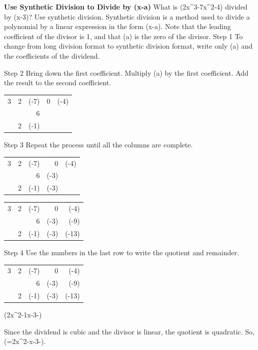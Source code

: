 \documentclass{article}
\newenvironment{example}[1]{}{}         %
\newcommand{\answer}[1]{}               %
\newcommand{\placeholder}[2]{}          %
\newcommand{\te}[1]{}                   %
\begin{document}
\begin{example}{2}
\textbf{Use Synthetic Division to Divide by (x-a)}
What is (2x^3-7x^2-4) divided by (x-3)? Use synthetic division.
Synthetic division is a method used to divide a polynomial by a linear expression in the form (x-a). Note that the leading coefficient of the divisor is 1, and that (a) is the zero of the divisor.
Step 1 To change from long division format to synthetic division format, write only (a) and the coefficients of the dividend.
\placeholder{diagram}{Conversion diagram: long-division setup (x-3) outside, (2x^3-7x^2+0x-4) inside. Down arrows connect -3 in divisor to red 3 labeled zero of the divisor, a, and connect dividend terms to blue coefficients 2, -7, 0, -4, labeled coefficients of the dividend. A short division bracket surrounds 3 at the left of coefficient row.}
Step 2 Bring down the first coefficient. Multiply (a) by the first coefficient. Add the result to the second coefficient.
\begin{tabular}{r|rrrr}
3 & 2 & (-7) & 0 & (-4) \\
 & & 6 & & \\
\hline
 & 2 & (-1) & & \\
\end{tabular}
\te{Callouts: (3\cdot2=6); (-7+6=-1). CONTINUED ON THE NEXT PAGE.}
Step 3 Repeat the process until all the columns are complete.
\begin{tabular}{r|rrrr}
3 & 2 & (-7) & 0 & (-4) \\
 & & 6 & (-3) & \\
\hline
 & 2 & (-1) & (-3) & \\
\end{tabular}
\te{Callout: (3\cdot-1=-3).}
\begin{tabular}{r|rrrr}
3 & 2 & (-7) & 0 & (-4) \\
 & & 6 & (-3) & (-9) \\
\hline
 & 2 & (-1) & (-3) & (-13) \\
\end{tabular}
\te{Callout: (3\cdot-3=-9). COMMON ERROR Remember to keep track of all positive and negative signs when multiplying.}
Step 4 Use the numbers in the last row to write the quotient and remainder.
\begin{tabular}{r|rrrr}
3 & 2 & (-7) & 0 & (-4) \\
 & & 6 & (-3) & (-9) \\
\hline
 & 2 & (-1) & (-3) & (-13) \\
\end{tabular}
(2x^2-1x-3-)
\te{Callouts label 2, -1, -3 as coefficients of the quotient and -13 as remainder, with downward arrows connecting each to the corresponding term.}
Since the dividend is cubic and the divisor is linear, the quotient is quadratic.
So, (=2x^2-x-3-).
\answer{(2x^2-x-3-\frac{13}{x-3})}
\te{USE STRUCTURE You can use the result to write the dividend (2x^3-7x-4) in the form ((2x^2-x-3)(x-3)-13). Printed callout omits the exponent 2 on the dividend's middle term.}
\end{example}
\end{document}
